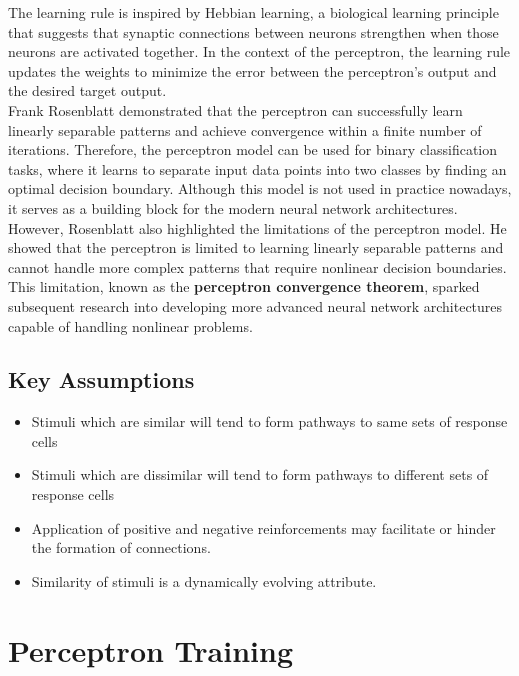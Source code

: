 \documentclass{report}
\begin{document}
\noindent The learning rule is inspired by Hebbian learning, a biological learning principle that suggests that synaptic connections between neurons strengthen when those neurons are activated together. In the context of the perceptron, the learning rule updates the weights to minimize the error between the perceptron's output and the desired target output. \\

\noindent Frank Rosenblatt demonstrated that the perceptron can successfully learn linearly separable patterns and achieve convergence within a finite number of iterations. Therefore, the perceptron model can be used for binary classification tasks, where it learns to separate input data points into two classes by finding an optimal decision boundary. Although this model is not used in practice nowadays, it serves as a building block for the modern neural network architectures. \\

\noindent However, Rosenblatt also highlighted the limitations of the perceptron model. He showed that the perceptron is limited to learning linearly separable patterns and cannot handle more complex patterns that require nonlinear decision boundaries. This limitation, known as the \textbf{perceptron convergence theorem}, sparked subsequent research into developing more advanced neural network architectures capable of handling nonlinear problems.

\subsection{Key Assumptions}
\begin{itemize}
  \item Stimuli which are similar will tend to form pathways to same sets of response cells
  \item Stimuli which are dissimilar will tend to form pathways to different sets of response cells
  \item Application of positive and negative reinforcements may facilitate or hinder the formation of connections.
  \item Similarity of stimuli is a dynamically evolving attribute.
\end{itemize}

\section{Perceptron Training}
\end{document}
